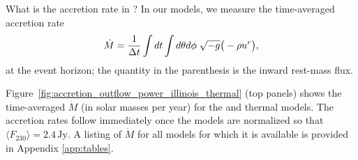 
What is the accretion rate in \sgra?  In our models, we measure the time-averaged accretion rate
\begin{equation}
  \dot{M} = \frac{1}{\Delta t}\int dt\int d\theta d\phi\hspace{0.1cm}\sqrt{-g}\big(-\rho u^{r}\big),
\end{equation}
at the event horizon; the quantity in the parenthesis is the inward rest-mass flux.

Figure~\ref{fig:accretion_outflow_power_illinois_thermal} (top panels) shows the time-averaged $\dot{M}$ (in solar masses per year) for the \kharma and \bhac thermal models.  The accretion rates follow immediately once the models are normalized so that $\langle F_{230}\rangle = 2.4\,\mathrm{Jy}$.  A listing of $\dot{M}$ for all models for which it is available is provided in Appendix \ref{app:tables}.


